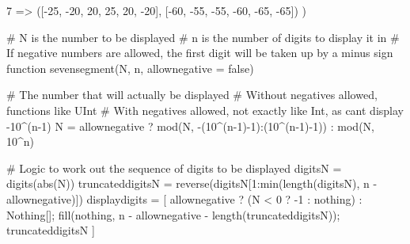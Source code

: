 \documentclass[
  letterpaper,
  DIV=11,
  numbers=noendperiod]{scrreprt}
\newenvironment{Shaded}{\begin{snugshade}}{\end{snugshade}}
\newcommand{\CommentTok}[1]{\textcolor[rgb]{0.37,0.37,0.37}{#1}}
\newcommand{\ConstantTok}[1]{\textcolor[rgb]{0.56,0.35,0.01}{#1}}
\newcommand{\DataTypeTok}[1]{\textcolor[rgb]{0.68,0.00,0.00}{#1}}
\newcommand{\FloatTok}[1]{\textcolor[rgb]{0.68,0.00,0.00}{#1}}
\newcommand{\FunctionTok}[1]{\textcolor[rgb]{0.28,0.35,0.67}{#1}}
\newcommand{\KeywordTok}[1]{\textcolor[rgb]{0.00,0.23,0.31}{#1}}
\newcommand{\NormalTok}[1]{\textcolor[rgb]{0.00,0.23,0.31}{#1}}
\newcommand{\OperatorTok}[1]{\textcolor[rgb]{0.37,0.37,0.37}{#1}}
\begin{document}
\begin{Shaded}
\begin{Highlighting}[]
    \FloatTok{7} \OperatorTok{=\textgreater{}}\NormalTok{ ([}\OperatorTok{{-}}\FloatTok{25}\NormalTok{, }\OperatorTok{{-}}\FloatTok{20}\NormalTok{, }\FloatTok{20}\NormalTok{, }\FloatTok{25}\NormalTok{, }\FloatTok{20}\NormalTok{, }\OperatorTok{{-}}\FloatTok{20}\NormalTok{], [}\OperatorTok{{-}}\FloatTok{60}\NormalTok{, }\OperatorTok{{-}}\FloatTok{55}\NormalTok{, }\OperatorTok{{-}}\FloatTok{55}\NormalTok{, }\OperatorTok{{-}}\FloatTok{60}\NormalTok{, }\OperatorTok{{-}}\FloatTok{65}\NormalTok{, }\OperatorTok{{-}}\FloatTok{65}\NormalTok{])}
\NormalTok{)}

\CommentTok{\# N is the number to be displayed}
\CommentTok{\# n is the number of digits to display it in}
\CommentTok{\# If negative numbers are allowed, the first digit will be taken up by a minus sign}
\KeywordTok{function} \FunctionTok{sevensegment}\NormalTok{(N, n, allownegative }\OperatorTok{=} \ConstantTok{false}\NormalTok{)}

    \CommentTok{\# The number that will actually be displayed}
    \CommentTok{\# Without negatives allowed, functions like UInt}
    \CommentTok{\# With negatives allowed, not exactly like Int, as can\textquotesingle{}t display {-}10\^{}(n{-}1)}
\NormalTok{    N }\OperatorTok{=}\NormalTok{ allownegative ?}
        \FunctionTok{mod}\NormalTok{(N, }\FunctionTok{{-}}\NormalTok{(}\FloatTok{10}\OperatorTok{\^{}}\NormalTok{(n}\OperatorTok{{-}}\FloatTok{1}\NormalTok{)}\OperatorTok{{-}}\FloatTok{1}\NormalTok{)}\OperatorTok{:}\NormalTok{(}\FloatTok{10}\OperatorTok{\^{}}\NormalTok{(n}\OperatorTok{{-}}\FloatTok{1}\NormalTok{)}\OperatorTok{{-}}\FloatTok{1}\NormalTok{)) }\OperatorTok{:}
        \FunctionTok{mod}\NormalTok{(N, }\FloatTok{10}\OperatorTok{\^{}}\NormalTok{n)}

    \CommentTok{\# Logic to work out the sequence of digits to be displayed}
\NormalTok{    digitsN }\OperatorTok{=} \FunctionTok{digits}\NormalTok{(}\FunctionTok{abs}\NormalTok{(N))}
\NormalTok{    truncateddigitsN }\OperatorTok{=} \FunctionTok{reverse}\NormalTok{(digitsN[}\FloatTok{1}\OperatorTok{:}\FunctionTok{min}\NormalTok{(}\FunctionTok{length}\NormalTok{(digitsN), n }\OperatorTok{{-}}\NormalTok{ allownegative)])}
\NormalTok{    displaydigits }\OperatorTok{=}\NormalTok{ [}
\NormalTok{        allownegative ? (N }\OperatorTok{\textless{}} \FloatTok{0}\NormalTok{ ? }\OperatorTok{{-}}\FloatTok{1} \OperatorTok{:} \ConstantTok{nothing}\NormalTok{) }\OperatorTok{:} \DataTypeTok{Nothing}\NormalTok{[];}
        \FunctionTok{fill}\NormalTok{(}\ConstantTok{nothing}\NormalTok{, n }\OperatorTok{{-}}\NormalTok{ allownegative }\OperatorTok{{-}} \FunctionTok{length}\NormalTok{(truncateddigitsN));}
\NormalTok{        truncateddigitsN}
\NormalTok{    ]}


\end{Highlighting}
\end{Shaded}
\end{document}
